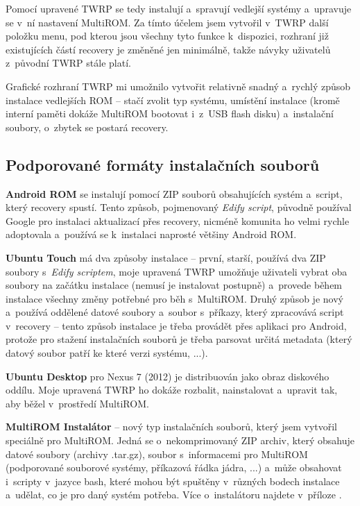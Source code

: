 \documentclass[12pt, a4paper, oneside]{article}
\newcommand{\B}{\textbf} %
\newcommand{\It}{\textit}  %
\begin{document}
Pomocí upravené TWRP se tedy instalují a~spravují vedlejší systémy a~upravuje se v~ní nastavení MultiROM. Za tímto účelem jsem vytvořil v~TWRP další položku menu, pod kterou jsou všechny tyto funkce k~dispozici, rozhraní již existujících částí recovery je změněné jen minimálně, takže návyky uživatelů z~původní TWRP stále platí.

Grafické rozhraní TWRP mi umožnilo vytvořit relativně snadný a~rychlý způsob instalace vedlejších ROM -- stačí zvolit typ systému, umístění instalace (kromě interní paměti dokáže MultiROM bootovat i~z~USB flash disku) a~instalační soubory, o~zbytek se postará recovery.

\subsection {Podporované formáty instalačních souborů}
\B{Android ROM} se instalují pomocí ZIP souborů obsahujících systém a~script, který recovery spustí. Tento způsob, pojmenovaný \It{Edify script}, původně používal Google pro instalaci aktualizací přes recovery, nicméně komunita ho velmi rychle adoptovala a~používá se k~instalaci naprosté většiny Android ROM.

\B{Ubuntu Touch} má dva způsoby instalace -- první, starší, používá dva ZIP soubory s~\It{Edify scriptem}, moje upravená TWRP umožňuje uživateli vybrat oba soubory na začátku instalace (nemusí je instalovat postupně) a~provede během instalace všechny změny potřebné pro běh s~MultiROM. Druhý způsob je nový a~používá oddělené datové soubory a~soubor s~příkazy, který zpracovává script v~recovery -- tento způsob instalace je třeba provádět přes aplikaci pro Android, protože pro stažení instalačních souborů je třeba parsovat určitá metadata (který datový soubor patří ke které verzi systému, ...).

\B{Ubuntu Desktop} pro Nexus 7 (2012) je distribuován jako obraz diskového oddílu. Moje upravená TWRP ho dokáže rozbalit, nainstalovat a~upravit tak, aby běžel v~prostředí MultiROM. 

\B{MultiROM Instalátor} -- nový typ instalačních souborů, který jsem vytvořil speciálně pro MultiROM. Jedná se o~nekomprimovaný ZIP archiv, který obsahuje datové soubory (archivy .tar.gz), soubor s~informacemi pro MultiROM (podporované souborové systémy, příkazová řádka jádra, ...) a~může obsahovat i~scripty v~jazyce bash, které mohou být spuštěny v~různých bodech instalace a~udělat, co je pro daný systém potřeba. Více o~instalátoru najdete v~příloze .
\end{document}
